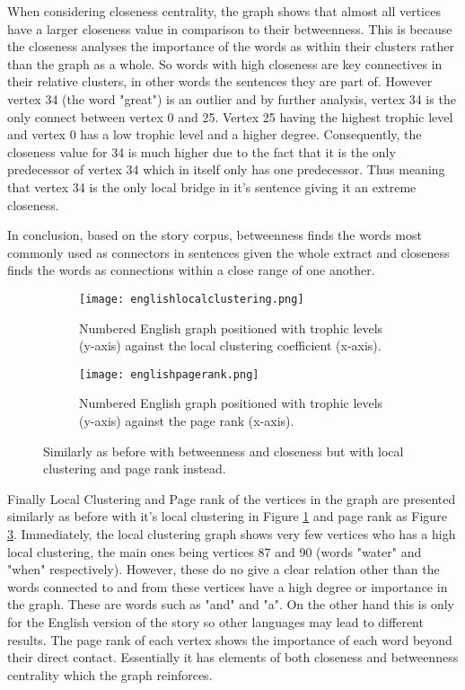 When considering closeness centrality, the graph shows that almost all vertices have a larger closeness value in comparison to their betweenness. This is because the closeness analyses the importance of the words as within their clusters rather than the graph as a whole. So words with high closeness are key connectives in their relative clusters, in other words the sentences they are part of. However vertex 34 (the word "great") is an outlier and by further analysis, vertex 34 is the only connect between vertex 0 and 25. Vertex 25 having the highest trophic level and vertex 0 has a low trophic level and a higher degree. Consequently, the closeness value for 34 is much higher due to the fact that it is the only predecessor of vertex 34 which in itself only has one predecessor. Thus meaning that vertex 34 is the only local bridge in it's sentence giving it an extreme closeness.

In conclusion, based on the story corpus, betweenness finds the words most commonly used as connectors in sentences given the whole extract and closeness finds the words as connections within a close range of one another.

\begin{figure}[H]
\centering
\begin{subfigure}{.45\textwidth}
	\hspace{-1cm} 
	\texttt{[image: englishlocalclustering.png]}
	\caption{Numbered English graph positioned with trophic levels (y-axis) against the local clustering coefficient (x-axis).}
	\label{fig:englc}
\end{subfigure}
\hfill
\begin{subfigure}{.45\textwidth}
	\hspace{-1cm} 
	\texttt{[image: englishpagerank.png]}
	\caption{Numbered English graph positioned with trophic levels (y-axis) against the page rank (x-axis).}
	\label{fig:engpr}
\end{subfigure}
\caption{Similarly as before with betweenness and closeness but with local clustering and page rank instead.}
\end{figure}

Finally Local Clustering and Page rank of the vertices in the graph are presented similarly as before with it's local clustering in Figure \ref{fig:englc} and page rank as Figure \ref{fig:engpr}. Immediately, the local clustering graph shows very few vertices who has a high local clustering, the main ones being vertices 87 and 90 (words "water" and "when" respectively). However, these do no give a clear relation other than the words connected to and from these vertices have a high degree or importance in the graph. These are words such as "and" and "a". On the other hand this is only for the English version of the story so other languages may lead to different results. The page rank of each vertex shows the importance of each word beyond their direct contact. Essentially it has elements of both closeness and betweenness centrality which the graph reinforces.


